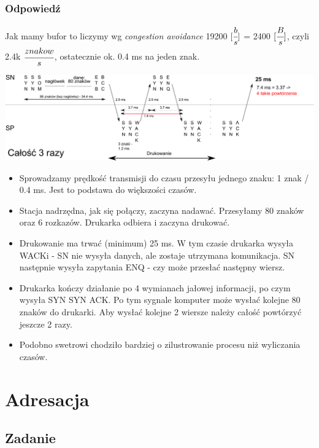 \documentclass[a4paper,twoside]{article}
\begin{document}
\subsubsection{Odpowiedź}
Jak mamy bufor to liczymy wg \emph{congestion avoidance}
19200 $ [\cfrac{b}{s}] $ = 2400 $ [\cfrac{B}{s}] $, czyli 2.4k $ \cfrac{znakow}{s} $, ostatecznie ok. 0.4 ms na jeden znak.
\begin{center}
	\includegraphics[width=16.0cm]{./images/zadanie13.pdf}
\end{center}
\begin{itemize}
	\item Sprowadzamy prędkość transmisji do czasu przesyłu jednego znaku: 1 znak / 0.4 ms. Jest to podstawa do większości czasów.
	\item Stacja nadrzędna, jak się połączy, zaczyna nadawać. Przesyłamy 80 znaków oraz 6 rozkazów. Drukarka odbiera i zaczyna drukować.
	\item Drukowanie ma trwać (minimum) 25 ms. W tym czasie drukarka wysyła WACKi - SN nie wysyła danych, ale zostaje utrzymana komunikacja. SN następnie wysyła zapytania ENQ - czy może przesłać następny wiersz.
	\item Drukarka kończy działanie po 4 wymianach jałowej informacji, po czym wysyła SYN SYN ACK. Po tym sygnale komputer może wysłać kolejne 80 znaków do drukarki. Aby wysłać kolejne 2 wiersze należy całość powtórzyć jeszcze 2 razy.
	\item Podobno swetrowi chodziło bardziej o zilustrowanie procesu niż wyliczania czasów.
\end{itemize}


\newpage
\section{Adresacja}
\subsection{Zadanie}
\end{document}
